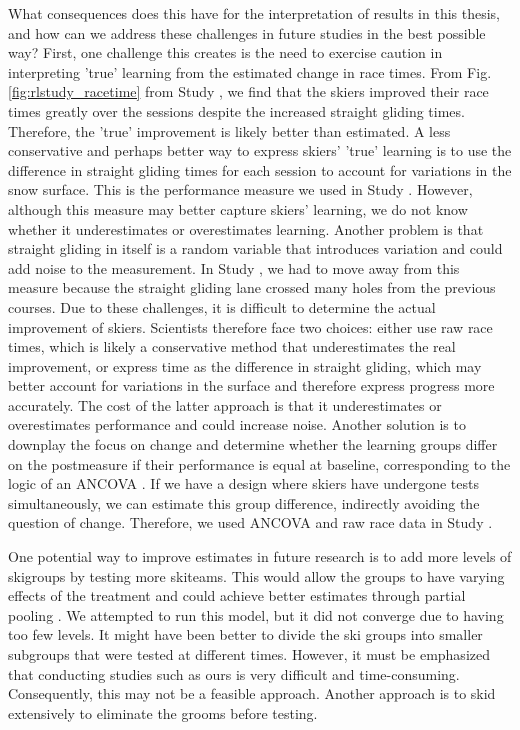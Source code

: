 What consequences does this have for the interpretation of results in this thesis, and how can we address these challenges in future studies in the best possible way? First, one challenge this creates is the need to exercise caution in interpreting 'true' learning from the estimated change in race times. From Fig. \ref{fig:rlstudy_racetime} from Study , we find that the skiers improved their race times greatly over the sessions despite the increased straight gliding times. Therefore, the 'true' improvement is likely better than estimated. A less conservative and perhaps better way to express skiers' 'true' learning is to use the difference in straight gliding times for each session to account for variations in the snow surface. This is the performance measure we used in Study . However, although this measure may better capture skiers' learning, we do not know whether it underestimates or overestimates learning. Another problem is that straight gliding in itself is a random variable that introduces variation and could add noise to the measurement. In Study , we had to move away from this measure because the straight gliding lane crossed many holes from the previous courses. Due to these challenges, it is difficult to determine the actual improvement of skiers. Scientists therefore face two choices: either use raw race times, which is likely a conservative method that underestimates the real improvement, or express time as the difference in straight gliding, which may better account for variations in the surface and therefore express progress more accurately. The cost of the latter approach is that it underestimates or overestimates performance and could increase noise. Another solution is to downplay the focus on change and determine whether the learning groups differ on the postmeasure if their performance is equal at baseline, corresponding to the logic of an ANCOVA \parencite{maxwell_designing_2017}. If we have a design where skiers have undergone tests simultaneously, we can estimate this group difference, indirectly avoiding the question of change. Therefore, we used ANCOVA and raw race data in Study .

One potential way to improve estimates in future research is to add more levels of skigroups by testing more skiteams. This would allow the groups to have varying effects of the treatment and could achieve better estimates through partial pooling \parencite{mcelreath_statistical_2018, judd_experiments_2017, judd_treating_2012, barr_learning_2021}. We attempted to run this model, but it did not converge due to having too few levels. It might have been better to divide the ski groups into smaller subgroups that were tested at different times. However, it must be emphasized that conducting studies such as ours is very difficult and time-consuming. Consequently, this may not be a feasible approach. Another approach is to skid extensively to eliminate the grooms before testing.

